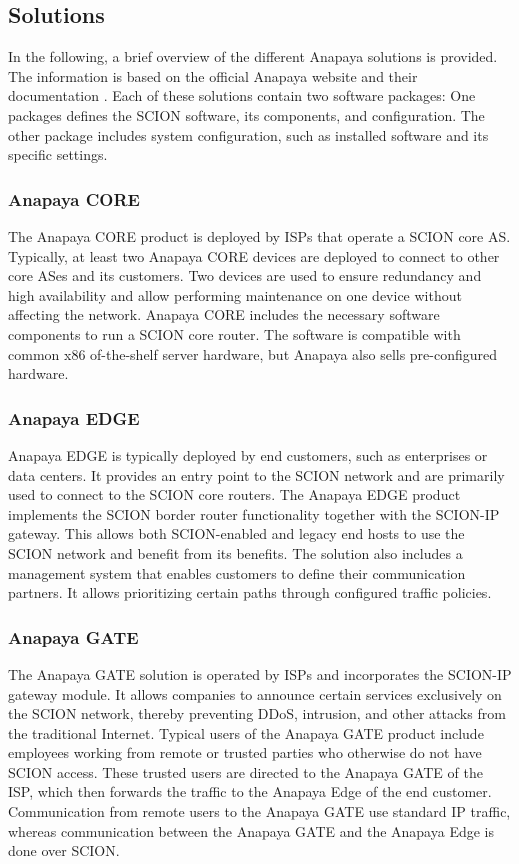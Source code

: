 \subsection{Solutions}
In the following, a brief overview of the different Anapaya solutions is provided.
The information is based on the official Anapaya website \cite{anapayaHomepage} and their documentation \cite{anapayaDocs}.
Each of these solutions contain two software packages:
One packages defines the SCION software, its components, and configuration.
The other package includes system configuration, such as installed software and its  specific settings.

\subsubsection{Anapaya CORE}
The Anapaya CORE product is deployed by ISPs that operate a SCION core AS.
Typically, at least two Anapaya CORE devices are deployed to connect to other core ASes and its customers.
Two devices are used to ensure redundancy and high availability and allow performing maintenance on one device without affecting the network.
Anapaya CORE includes the necessary software components to run a SCION core router.
The software is compatible with common x86 of-the-shelf server hardware, but Anapaya also sells pre-configured hardware.


\subsubsection{Anapaya EDGE}
Anapaya EDGE is typically deployed by end customers, such as enterprises or data centers.
It provides an entry point to the SCION network and are primarily used to connect to the SCION core routers.
The Anapaya EDGE product implements the SCION border router functionality together with the SCION-IP gateway.
This allows both SCION-enabled and legacy end hosts to use the SCION network and benefit from its benefits.
The solution also includes a management system that enables customers to define their communication partners.
It allows prioritizing certain paths through configured traffic policies.

\subsubsection{Anapaya GATE}
The Anapaya GATE solution is operated by ISPs and incorporates the SCION-IP gateway module.
It allows companies to announce certain services exclusively on the SCION network, thereby preventing DDoS, intrusion, and other attacks from the traditional Internet.
Typical users of the Anapaya GATE product include employees working from remote or trusted parties who otherwise do not have SCION access.
These trusted users are directed to the Anapaya GATE of the ISP, which then forwards the traffic to the Anapaya Edge of the end customer.
Communication from remote users to the Anapaya GATE use standard IP traffic, whereas communication between the Anapaya GATE and the Anapaya Edge is done over SCION.

